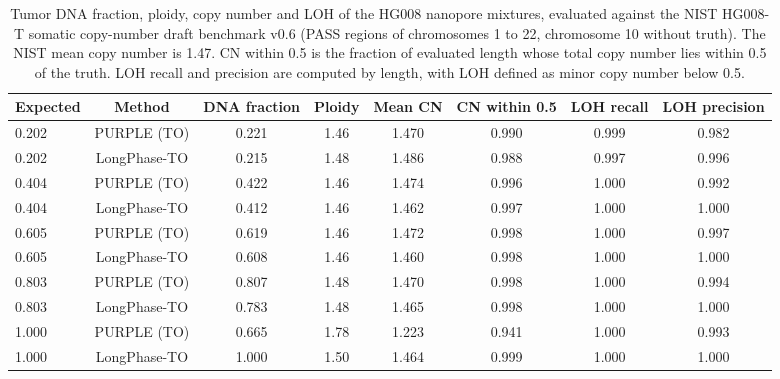 \documentclass[pdflatex,sn-nature]{sn-jnl}
\begin{document}
\begin{table}[htbp]
  \centering
  \caption[HG008 external test]%
  {Tumor DNA fraction, ploidy, copy number and LOH of the HG008 nanopore mixtures, evaluated against the NIST HG008-T somatic copy-number draft benchmark v0.6 (PASS regions of chromosomes 1 to 22, chromosome 10 without truth). The NIST mean copy number is 1.47. CN within 0.5 is the fraction of evaluated length whose total copy number lies within 0.5 of the truth. LOH recall and precision are computed by length, with LOH defined as minor copy number below 0.5.}
  \label{tab:hg008}
  \small
  \begin{tabular}{@{}lccccccc@{}}
    \toprule
    Expected & Method & DNA fraction & Ploidy & Mean CN & CN within 0.5 & LOH recall & LOH precision \\
    \midrule
    0.202 & PURPLE (TO) & 0.221 & 1.46 & 1.470 & 0.990 & 0.999 & 0.982 \\
    0.202 & LongPhase-TO & 0.215 & 1.48 & 1.486 & 0.988 & 0.997 & 0.996 \\
    0.404 & PURPLE (TO) & 0.422 & 1.46 & 1.474 & 0.996 & 1.000 & 0.992 \\
    0.404 & LongPhase-TO & 0.412 & 1.46 & 1.462 & 0.997 & 1.000 & 1.000 \\
    0.605 & PURPLE (TO) & 0.619 & 1.46 & 1.472 & 0.998 & 1.000 & 0.997 \\
    0.605 & LongPhase-TO & 0.608 & 1.46 & 1.460 & 0.998 & 1.000 & 1.000 \\
    0.803 & PURPLE (TO) & 0.807 & 1.48 & 1.470 & 0.998 & 1.000 & 0.994 \\
    0.803 & LongPhase-TO & 0.783 & 1.48 & 1.465 & 0.998 & 1.000 & 1.000 \\
    1.000 & PURPLE (TO) & 0.665 & 1.78 & 1.223 & 0.941 & 1.000 & 0.993 \\
    1.000 & LongPhase-TO & 1.000 & 1.50 & 1.464 & 0.999 & 1.000 & 1.000 \\
    \bottomrule
  \end{tabular}
\end{table}
\end{document}
